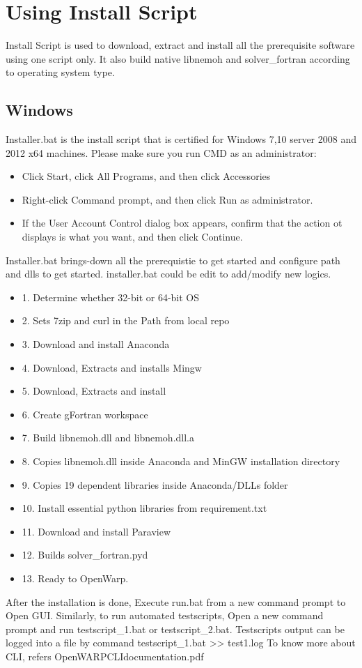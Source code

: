 \documentclass[12pt]{article}
\begin{document}
\section{Using Install Script}
Install Script is used to download, extract and install all the prerequisite software using one script only. It also build native libnemoh and solver_fortran according to operating system type.

\subsection{Windows}
 Installer.bat is the install script that is certified for Windows 7,10 server 2008 and 2012 x64 machines. Please make sure you run CMD as an administrator:
\begin{itemize}
\item Click Start, click All Programs, and then click Accessories
\item Right-click Command prompt, and then click Run as administrator.
\item If the User Account Control dialog box appears, confirm that the action ot displays is what you want, and then click Continue.
\end{itemize}
Installer.bat brings-down all the prerequistie to get started and configure path and dlls to get started. installer.bat could be edit to add/modify new logics.
 \begin{itemize}
 \item 1. Determine whether 32-bit or 64-bit OS
 \item 2. Sets 7zip and curl in the Path from local repo
 \item 3. Download and install Anaconda 
 \item 4. Download, Extracts and installs Mingw
 \item 5. Download, Extracts and install  
 \item 6. Create gFortran workspace 
 \item 7. Build libnemoh.dll and libnemoh.dll.a
 \item 8. Copies libnemoh.dll inside Anaconda and MinGW installation directory
 \item 9. Copies 19 dependent libraries inside Anaconda/DLLs folder
 \item 10. Install essential python libraries from requirement.txt
 \item 11. Download and install Paraview
 \item 12. Builds solver_fortran.pyd 
 \item 13. Ready to OpenWarp.  
 \end{itemize}
 After the installation is done, Execute run.bat from a new command prompt to Open GUI.
 Similarly, to run automated testscripts, Open a new command prompt and run testscript_1.bat or testscript_2.bat. Testscripts output can be logged into a file by command testscript_1.bat >> test1.log To know more about CLI, refers OpenWARPCLIdocumentation.pdf
 
\end{document}
